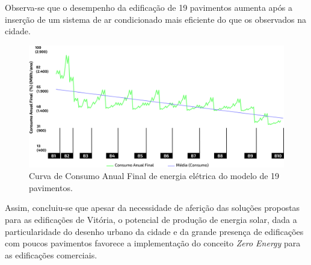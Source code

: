 \begin{onehalfspace}
    \noindent Observa-se que o desempenho da edificação de 19 pavimentos aumenta após a inserção
    de um sistema de ar condicionado mais eficiente do que os observados na cidade.

    \begin{figure}[H]
        \label{fig:5}
        \centering
        \includegraphics[width=1\textwidth]{figures/grafico-19pav.png}
        \caption{Curva de Consumo Anual Final de energia elétrica do modelo de 19 pavimentos.}
    \end{figure}

    \noindent Assim, concluiu-se que apesar da necessidade de aferição das soluções propostas para 
    as edificações de Vitória, o potencial de produção de energia solar, dada a particularidade
    do desenho urbano da cidade e da grande presença de edificações com poucos pavimentos favorece
    a implementação do conceito \textit{Zero Energy} para as edificações comerciais.
\end{onehalfspace}
